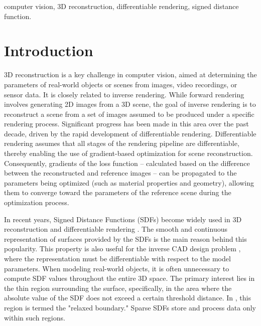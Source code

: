 \documentclass{ieeeaccess}
\begin{document}
\begin{keywords}
computer vision, 3D reconstruction, differentiable rendering, signed distance function.
\end{keywords}

\titlepgskip=-21pt
\maketitle

\section{Introduction}

3D reconstruction is a key challenge in computer vision, aimed at determining the parameters of real-world objects or scenes from images, video recordings, or sensor data. It is closely related to inverse rendering. While forward rendering involves generating 2D images from a 3D scene, the goal of inverse rendering is to reconstruct a scene from a set of images assumed to be produced under a specific rendering process. Significant progress has been made in this area over the past decade, driven by the rapid development of differentiable rendering. Differentiable rendering assumes that all stages of the rendering pipeline are differentiable, thereby enabling the use of gradient-based optimization for scene reconstruction. Consequently, gradients of the loss function -- calculated based on the difference between the reconstructed and reference images -- can be propagated to the parameters being optimized (such as material properties and geometry), allowing them to converge toward the parameters of the reference scene during the optimization process.

In recent years, Signed Distance Functions (SDFs) become widely used in 3D reconstruction \cite{ref-lin-2020,ref-sommer-2022,ref-slavcheva-2016} and differentiable rendering \cite{DRSDF2022,RelaxBoundary}. The smooth and continuous representation of surfaces provided by the SDFs is the main reason behind this popularity. This property is also useful for the inverse CAD design problem \cite{invCAD1,invCAD2}, where the representation must be differentiable with respect to the model parameters. When modeling real-world objects, it is often unnecessary to compute SDF values throughout the entire 3D space. The primary interest lies in the thin region surrounding the surface, specifically, in the area where the absolute value of the SDF does not exceed a certain threshold distance. In \cite{RelaxBoundary}, this region is termed the "relaxed boundary." Sparse SDFs store and process data only within such regions.
\end{document}
